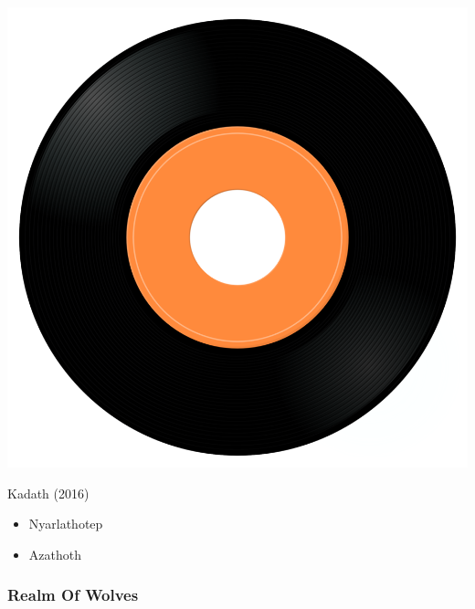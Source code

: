 \begin{minipage}[t]{0.25\textwidth}
\captionsetup{type=figure}
\includegraphics[width=\textwidth]{Images/cover.png}
\caption*{Kadath (2016)}
\end{minipage}
\begin{minipage}[t]{0.25\textwidth}\vspace{0pt}
\begin{itemize}[nosep,leftmargin=1em,labelwidth=*,align=left]
	\setlength{\itemsep}{0pt}
	\item Nyarlathotep 
	\item Azathoth 
\end{itemize}
\end{minipage}

\subsubsection{Realm Of Wolves}

